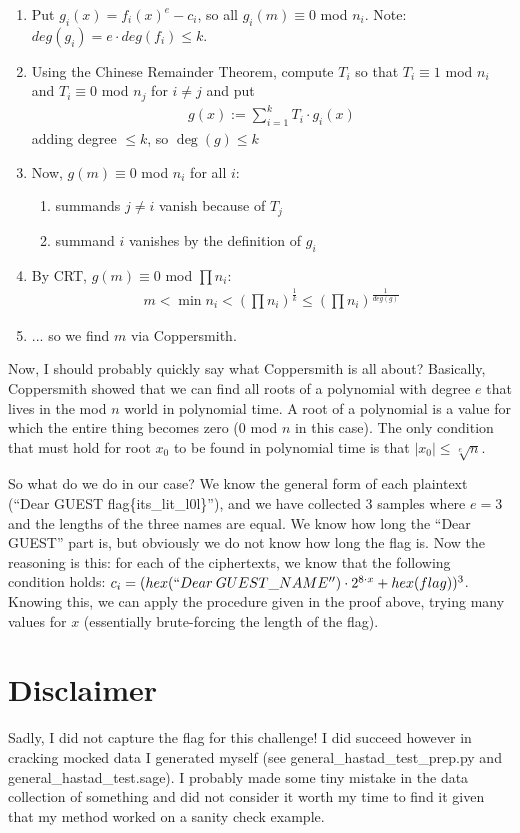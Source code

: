\documentclass{article}
\begin{document}
\begin{enumerate}
    \item Put $g_i(x)=f_i(x)^{e}-c_i$, so all $g_i(m) \equiv 0$ mod $n_i$. Note: $deg(g_i)=e \cdot deg(f_i) \leq k$.
    \item Using the Chinese Remainder Theorem, compute $T_i$ so that $T_i \equiv 1$ mod $n_i$ and $T_i \equiv 0$ mod $n_j$ for $i \neq j$ and put
        \begin{align*}
            g(x) := \sum_{i=1}^{k} T_i \cdot g_i(x)
        \end{align*} 
        adding degree $\leq k$, so $\deg(g) \leq k$
    \item Now, $g(m) \equiv 0$ mod $n_i$ for all $i$:
        \begin{enumerate}
            \item summands $j \neq i$ vanish because of $T_j$
            \item summand $i$ vanishes by the definition of $g_i$
        \end{enumerate}
    \item By CRT, $g(m) \equiv 0$ mod $\prod n_i$: 
        \begin{align*}
            m < \min n_i < (\prod n_i)^{\frac{1}{k}} \leq (\prod n_i)^{\frac{1}{deg(g)}}
        \end{align*}
    \item ... so we find $m$ via Coppersmith.  
\end{enumerate}

Now, I should probably quickly say what Coppersmith is all about? Basically, Coppersmith showed that we can find all roots of a polynomial with degree $e$ that lives in the mod $n$ world in polynomial time. A root of a polynomial is a value for which the entire thing becomes zero (0 mod $n$ in this case). The only condition that must hold for root $x_0$ to be found in polynomial time is that $|x_0| \leq \sqrt[e]{n}$. \medskip

So what do we do in our case? We know the general form of each plaintext (``Dear GUEST flag\{its\_lit\_l0l\}''), and we have collected 3 samples where $e=3$ and the lengths of the three names are equal. We know how long the ``Dear GUEST'' part is, but obviously we do not know how long the flag is. Now the reasoning is this: for each of the ciphertexts, we know that the following condition holds: $c_i = (hex(``Dear \medspace GUEST\_NAME'') \cdot 2^{8 \cdot x} + hex(flag))^3$. Knowing this, we can apply the procedure given in the proof above, trying many values for $x$ (essentially brute-forcing the length of the flag).

\section{Disclaimer}

Sadly, I did not capture the flag for this challenge! I did succeed however in cracking mocked data I generated myself (see general\_hastad\_test\_prep.py and general\_hastad\_test.sage). I probably made some tiny mistake in the data collection of something and did not consider it worth my time to find it given that my method worked on a sanity check example.
\end{document}
